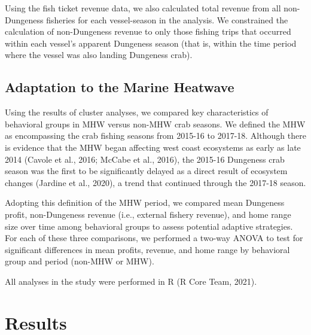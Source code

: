 \documentclass[]{elsarticle} %
\begin{document}
Using the fish ticket revenue data, we also calculated total revenue
from all non-Dungeness fisheries for each vessel-season in the analysis.
We constrained the calculation of non-Dungeness revenue to only those
fishing trips that occurred within each vessel's apparent Dungeness
season (that is, within the time period where the vessel was also
landing Dungeness crab).

\hypertarget{adaptation-to-the-marine-heatwave}{%
\subsection{Adaptation to the Marine
Heatwave}\label{adaptation-to-the-marine-heatwave}}

Using the results of cluster analyses, we compared key characteristics
of behavioral groups in MHW versus non-MHW crab seasons. We defined the
MHW as encompassing the crab fishing seasons from 2015-16 to 2017-18.
Although there is evidence that the MHW began affecting west coast
ecosystems as early as late 2014 (Cavole et al., 2016; McCabe et al.,
2016), the 2015-16 Dungeness crab season was the first to be
significantly delayed as a direct result of ecosystem changes (Jardine
et al., 2020), a trend that continued through the 2017-18 season.

Adopting this definition of the MHW period, we compared mean Dungeness
profit, non-Dungeness revenue (i.e., external fishery revenue), and home
range size over time among behavioral groups to assess potential
adaptive strategies. For each of these three comparisons, we performed a
two-way ANOVA to test for significant differences in mean profits,
revenue, and home range by behavioral group and period (non-MHW or MHW).

All analyses in the study were performed in R (R Core Team, 2021).

\hypertarget{results}{%
\section{Results}\label{results}}
\end{document}
